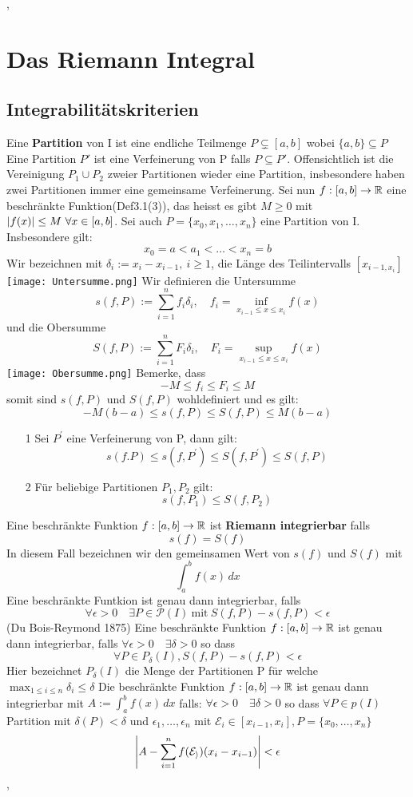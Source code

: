 \sep
\section{Das Riemann Integral}
\subsection{Integrabilitätskriterien}
\Def[5.1] Eine \textbf{Partition} von I ist eine endliche Teilmenge \(P \subsetneq[a, b]\) wobei \(\{a,b\} \subseteq P\)
Eine Partition \(P'\) ist eine Verfeinerung von P falls \( P \subseteq P'\). Offensichtlich ist die Vereinigung \( P_1 \cup P_2\) zweier Partitionen wieder eine Partition, insbesondere haben zwei Partitionen immer eine gemeinsame Verfeinerung.
Sei nun \( f:[a,b] \rightarrow \mathbb{R}\) eine beschränkte Funktion(Def3.1(3)), das heisst es gibt \( M \geq 0\) mit \( \left\lvert f(x) \right\rvert \leq M \ \forall x \in [a,b]\). Sei auch \( P= \{x_0, x_1, \dots, x_n\}\) eine Partition von I. Insbesondere gilt:
\[ x_0 = a < a_1 < \dots < x_n =b\]
Wir bezeichnen mit \( \delta_i := x_i - x_{i-1}, \ i \geq 1\), die Länge des Teilintervalls \([x_{i-1,x_i}] \)
\texttt{[image: Untersumme.png]}
Wir definieren die Untersumme
\[s(f,P) := \sum_{i=1}^n f_i \delta_i, \quad f_i = \inf_{x_{i-1} \leq x \leq x_i} f(x)\]
und die Obersumme
\[S(f,P) := \sum_{i=1}^n F_i \delta_i, \quad F_i = \sup_{x_{i-1} \leq x \leq x_i} f(x)\]
\hspace*{-3mm}\texttt{[image: Obersumme.png]}
Bemerke, dass
\[ -M \leq f_i \leq F_i \leq M\]
somit sind \(s(f,P)\) und \(S(f,P)\) wohldefiniert und es gilt:
\[ -M(b-a) \leq s(f,P) \leq S(f,P) \leq M(b-a)\]
\Lemma[5.2]
\begin{enumerate}
    \item [1] Sei \(P^{'}\) eine Verfeinerung von P, dann gilt:
    \[s(f.P) \leq s(f,P^{'}) \leq S(f, P^{'}) \leq S(f,P)\]
    \item [2] Für beliebige Partitionen \(P_1, P_2\) gilt:
    \[s(f,P_1) \leq S(f, P_2)\]
\end{enumerate}
\Def[5.3] Eine beschränkte Funktion \(f: [a,b] \rightarrow \mathbb{R} \) ist \textbf{Riemann integrierbar} falls
\[s(f) = S(f)\]
In diesem Fall bezeichnen wir den gemeinsamen Wert von \(s(f)\) und \(S(f)\) mit
\[ \int_{a}^{b} f(x) \,dx \]
\Satz[5.4] Eine beschränkte Funtkion ist genau dann integrierbar, falls
\[ \forall \epsilon > 0 \quad \exists P \in \mathcal{P}(I) \ \text{mit} \ S(f,P) - s(f,P) < \epsilon \] 
\Satz[5.8](Du Bois-Reymond 1875)
Eine beschränkte Funktion \(f : [a,b] \rightarrow \mathbb{R} \) ist genau dann integrierbar, falls \( \forall \epsilon > 0 \quad \exists \delta > 0\) so dass
\[ \forall P \in P_{\delta}(I), S(f, P) - s(f, P ) < \epsilon \]
Hier bezeichnet \( P_\delta (I)\) die Menge der Partitionen P für welche \( \max_{1 \leq i \leq n} \delta_i \leq \delta\) \newline
\Korollar[5.9] Die beschränkte Funktion \(f: [a,b] \rightarrow \mathbb{R} \) ist genau dann integrierbar mit \(A:= \int_{a}^{b} f(x) \,dx\) falls:
\( \forall \epsilon > 0 \quad \exists \delta > 0 \) so dass \( \forall P \in p(I) \) Partition mit \( \delta(P) < \delta \) und \( \epsilon_1, \dots, \epsilon_n\) mit
\(\mathcal{E}_i \in [x_{i-1}, x_i], P= \{x_0, \dots, x_n\}\)
\[\left\lvert  A - \sum_{i=1}^n f(\mathcal{E_i}) ( x_i - x_{i-1})  \right\rvert < \epsilon \]
\sep
